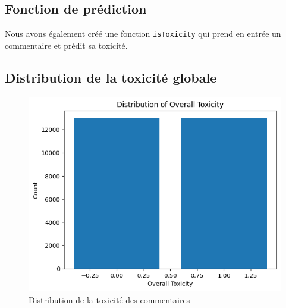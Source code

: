 \subsection{Fonction de prédiction}

Nous avons également créé une fonction \texttt{isToxicity} qui prend en entrée un commentaire et prédit sa toxicité.

\subsection{Distribution de la toxicité globale}

\begin{figure}[h]
    \centering
    \includegraphics[width=.47\linewidth]{figures/distribution-toxicity-naive_bayes.png}
    \caption{Distribution de la toxicité des commentaires}
\end{figure}



